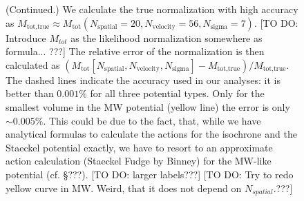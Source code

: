 \documentclass[12pt,preprint]{aastex}
\begin{document}
\addtocounter{figure}{-1}
\begin{figure} [t!]
  \caption{(Continued.) We calculate the true normalization with high accuracy as $M_\text{tot,true} \approx M_\text{tot}(N_\text{spatial}=20,N_\text{velocity}=56,N_\text{sigma}=7)$. [TO DO: Introduce $M_{tot}$ as the likelihood normalization somewhere as formula... ???] The relative error of the normalization is then calculated as $(M_\text{tot}[N_\text{spatial},N_\text{velocity},N_\text{sigma}] -  M_\text{tot,true} ) / M_\text{tot,true} $. The dashed lines indicate the accuracy used in our analyses: it is better than $0.001\%$ for all three potential types. Only for the smallest volume in the MW potential (yellow line) the error is only $\sim 0.005\%$. This could be due to the fact, that, while we have analytical formulas to calculate the actions for the isochrone and the Staeckel potential exactly, we have to resort to an approximate action calculation (Staeckel Fudge by Binney) for the MW-like potential (cf. \S ???). [TO DO: larger labels???] [TO DO: Try to redo yellow curve in MW. Weird, that it does not depend on $N_{spatial}$.???]}
\end{figure}
%
\end{document}
